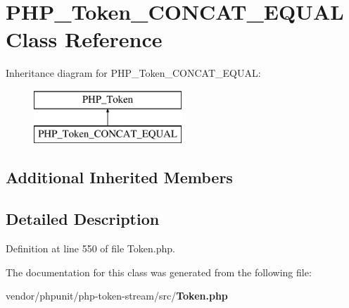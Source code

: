 \section{P\+H\+P\+\_\+\+Token\+\_\+\+C\+O\+N\+C\+A\+T\+\_\+\+E\+Q\+U\+A\+L Class Reference}
\label{class_p_h_p___token___c_o_n_c_a_t___e_q_u_a_l}
Inheritance diagram for P\+H\+P\+\_\+\+Token\+\_\+\+C\+O\+N\+C\+A\+T\+\_\+\+E\+Q\+U\+A\+L\+:\begin{figure}[H]
\begin{center}
\leavevmode
\includegraphics[height=2.000000cm]{class_p_h_p___token___c_o_n_c_a_t___e_q_u_a_l}
\end{center}
\end{figure}
\subsection*{Additional Inherited Members}


\subsection{Detailed Description}


Definition at line 550 of file Token.\+php.



The documentation for this class was generated from the following file\+:\begin{DoxyCompactItemize}
\item 
vendor/phpunit/php-\/token-\/stream/src/{\bf Token.\+php}\end{DoxyCompactItemize}
